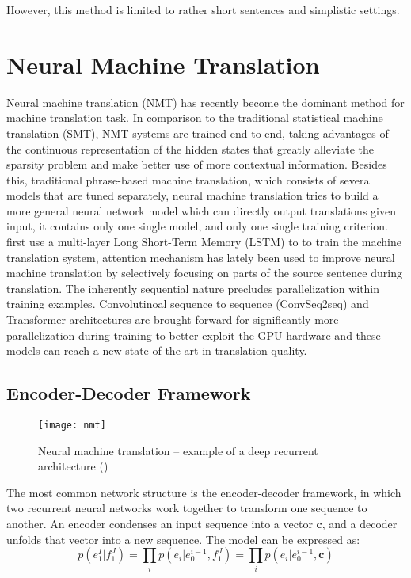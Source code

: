 However, this method is limited to rather short sentences and simplistic settings.
\section{Neural Machine Translation}
Neural machine translation (NMT) has recently become the dominant method for machine translation task. In comparison to the traditional statistical machine translation (SMT), NMT systems are trained end-to-end, taking advantages of the continuous representation of the hidden states that greatly alleviate the sparsity problem and make better use of more contextual information. Besides this, traditional phrase-based machine translation, which consists of several models that are tuned separately, neural machine translation tries to build a more general neural network model which can directly output translations given input, it contains only one single model, and only one single training criterion. \\
\cite{sutskever2014sequence} first use a multi-layer Long Short-Term Memory (LSTM) to to train the machine translation system, attention mechanism has lately been used to improve neural machine translation by selectively focusing on parts of the source sentence during translation. The inherently sequential nature precludes parallelization within training examples. Convolutinoal sequence to sequence (ConvSeq2seq) and Transformer architectures are brought forward  for significantly more parallelization during training to better exploit the GPU hardware and these models can reach a new state of the art in
translation quality.


\subsection{Encoder-Decoder Framework}
\begin{figure}[t]
	\texttt{[image: nmt]}
	\caption{ Neural machine translation – example of a deep recurrent architecture (\cite{luong2015effective})}
	\centering
\end{figure}

The most common network structure is the encoder-decoder framework, in which two recurrent neural networks work together to transform one sequence to another. An encoder condenses an input sequence into a vector $\bm{c}$, and a decoder unfolds that vector into a new sequence. The model can be expressed as:
\[ p(e_1^I | f_1^J) = \prod_{i} p(e_i|e_0^{i-1}, f_1^J) = \prod_{i} {p(e_i|e_0^{i-1},  {\bm{c}})} \] 

